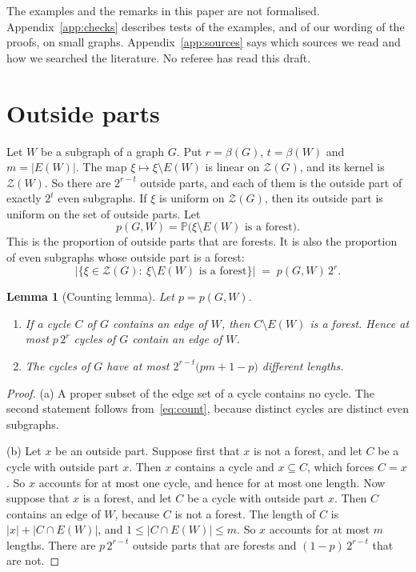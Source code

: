 \documentclass[11pt]{article}
\newtheorem{lemma}[theorem]{Lemma}
\theoremstyle{definition}
\theoremstyle{remark}
\newcommand{\Z}{\mathcal{Z}}
\newcommand{\PP}{\mathbb{P}}
\newcommand{\sm}{\setminus}
\numberwithin{equation}{section}
\begin{document}
The examples and the remarks in this paper are not formalised. Appendix~\ref{app:checks} describes
tests of the examples, and of our wording of the proofs, on small graphs.
Appendix~\ref{app:sources} says which sources we read and how we searched the literature. No
referee has read this draft.

\section{Outside parts}\label{sec:count}

Let $W$ be a subgraph of a graph $G$. Put $r=\beta(G)$, $t=\beta(W)$ and $m=|E(W)|$. The map
$\xi\mapsto\xi\sm E(W)$ is linear on $\Z(G)$, and its kernel is $\Z(W)$. So there are $2^{r-t}$
outside parts, and each of them is the outside part of exactly $2^{t}$ even subgraphs. If $\xi$ is
uniform on $\Z(G)$, then its outside part is uniform on the set of outside parts. Let
\[
  p(G,W)=\PP\bigl(\xi\sm E(W)\text{ is a forest}\bigr).
\]
This is the proportion of outside parts that are forests. It is also the proportion of even
subgraphs whose outside part is a forest:
\begin{equation}\label{eq:count}
  \bigl|\{\xi\in\Z(G):\ \xi\sm E(W)\text{ is a forest}\}\bigr|\;=\;p(G,W)\,2^{r}.
\end{equation}

\begin{lemma}[Counting lemma]\label{lem:count}
Let $p=p(G,W)$.
\begin{enumerate}
\item[\textup{(a)}] If a cycle $C$ of $G$ contains an edge of $W$, then $C\sm E(W)$ is a forest.
Hence at most $p\,2^{r}$ cycles of $G$ contain an edge of $W$.
\item[\textup{(b)}] The cycles of $G$ have at most $2^{r-t}\bigl(pm+1-p\bigr)$ different lengths.
\end{enumerate}
\end{lemma}

\begin{proof}
(a) A proper subset of the edge set of a cycle contains no cycle. The second statement follows
from~\eqref{eq:count}, because distinct cycles are distinct even subgraphs.

(b) Let $x$ be an outside part. Suppose first that $x$ is not a forest, and let $C$ be a cycle with
outside part $x$. Then $x$ contains a cycle and $x\subseteq C$, which forces $C=x$. So $x$ accounts
for at most one cycle, and hence for at most one length. Now suppose that $x$ is a forest, and let
$C$ be a cycle with outside part $x$. Then $C$ contains an edge of $W$, because $C$ is not a
forest. The length of $C$ is $|x|+|C\cap E(W)|$, and $1\le|C\cap E(W)|\le m$. So $x$ accounts for
at most $m$ lengths. There are $p\,2^{r-t}$ outside parts that are forests and $(1-p)\,2^{r-t}$
that are not.
\end{proof}
\end{document}
